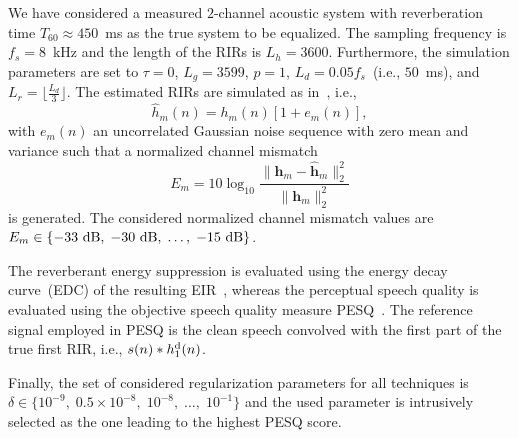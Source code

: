 \documentclass[11pt,draftcls,onecolumn]{IEEEtran}
\begin{document}
We have considered a measured $2$-channel acoustic system with reverberation time $T_{60} \approx 450$~ms as the true system to be equalized.
The sampling frequency is $f_s = 8$~kHz and the length of the RIRs is $L_h = 3600$.
Furthermore, the simulation parameters are set to $\tau = 0$, $L_g = 3599$, $p = 1$, $L_d = 0.05 f_s$~(i.e., $50$~ms), and $L_r = \lfloor \frac{L_d}{3} \rfloor$.
The estimated RIRs are simulated as in~\cite{Kodrasi_ITASLP_2013}, i.e., 
\begin{equation}
\hat{h}_m(n) = h_m(n)[1+e_m(n)],
\end{equation}
with $e_m(n)$ an uncorrelated Gaussian noise sequence with zero mean and variance such that a normalized channel mismatch 
\begin{equation}
 E_m = 10 \log_{10} \frac{\|\mathbf{h}_m-\hat{\mathbf{h}}_m\|_2^2}{\|\mathbf{h}_m\|_2^2}
\end{equation}
is generated. 
The considered normalized channel mismatch values are $E_m \in \{-33~{\rm dB}, \; -30~{\rm dB}, \; \ldots, \; -15~{\rm dB} \}$.

The reverberant energy suppression is evaluated using the energy decay curve~(EDC) of the resulting EIR~\cite{Naylor_derev_book}, whereas the perceptual speech quality is evaluated using the objective speech quality measure PESQ~\cite{PESQ}.
The reference signal employed in PESQ is the clean speech convolved with the first part of the true first RIR, i.e., $s(n) \ast h_1^{\rm d}(n)$.

Finally, the set of considered regularization parameters for all techniques is $\delta \in \{10^{-9}, \; 0.5 \times 10^{-8}, \; 10^{-8}, \; \ldots, \; 10^{-1} \}$ and the used parameter is intrusively selected as the one leading to the highest PESQ score.
\end{document}

